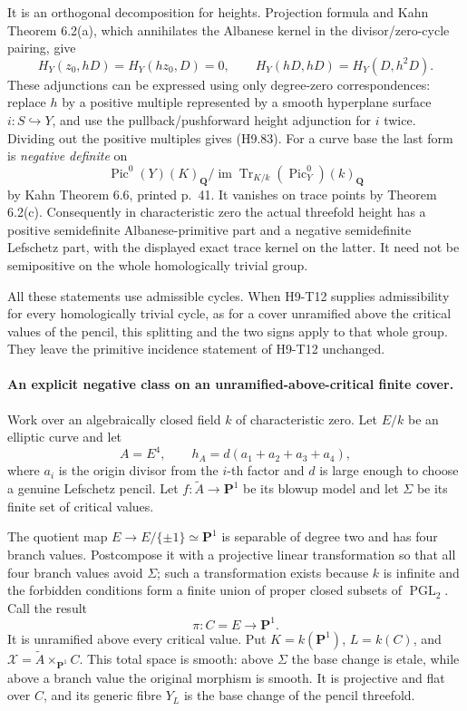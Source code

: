 It is an orthogonal decomposition for heights. Projection formula
and Kahn Theorem 6.2(a), which annihilates the Albanese kernel in
the divisor/zero-cycle pairing, give
\[
 H_Y(z_0,hD)=H_Y(hz_0,D)=0,
 \qquad
 H_Y(hD,hD)=H_Y(D,h^2D).                                   \tag{H9.83}
\]
These adjunctions can be expressed using only degree-zero
correspondences: replace $h$ by a positive multiple represented by
a smooth hyperplane surface $i:S\hookrightarrow Y$, and use the
pullback/pushforward height adjunction for $i$ twice. Dividing out
the positive multiples gives (H9.83).
For a curve base the last form is \emph{negative definite} on
\[
 \operatorname{Pic}^0(Y)(K)_{\mathbf Q}/
       \operatorname{im}\operatorname{Tr}_{K/k}
                         (\operatorname{Pic}^0_Y)(k)_{\mathbf Q}
\]
by Kahn Theorem 6.6, printed p.~41. It vanishes on trace points by
Theorem 6.2(c). Consequently in characteristic zero the actual
threefold height has a positive semidefinite Albanese-primitive
part and a negative semidefinite Lefschetz part, with the displayed
exact trace kernel on the latter. It need not be semipositive on
the whole homologically trivial group.

All these statements use admissible cycles. When H9-T12 supplies
admissibility for every homologically trivial cycle, as for a cover
unramified above the critical values of the pencil, this splitting
and the two signs apply to that whole group. They leave the
primitive incidence statement of H9-T12 unchanged.

\paragraph{An explicit negative class on an unramified-above-critical finite cover.}
Work over an algebraically closed field $k$ of characteristic zero.
Let $E/k$ be an elliptic curve and let
\[
 A=E^4,\qquad h_A=d(a_1+a_2+a_3+a_4),
\]
where $a_i$ is the origin divisor from the $i$-th factor and $d$
is large enough to choose a genuine Lefschetz pencil. Let
$f:\widetilde A\to\mathbf P^1$ be its blowup model and let
$\Sigma$ be its finite set of critical values.

The quotient map $E\to E/\{\pm1\}\simeq\mathbf P^1$ is separable
of degree two and has four branch values. Postcompose it with a
projective linear transformation so that all four branch values
avoid $\Sigma$; such a transformation exists because $k$ is
infinite and the forbidden conditions form a finite union of
proper closed subsets of $\operatorname{PGL}_2$. Call the result
\[
                   \pi:C=E\longrightarrow\mathbf P^1.
\]
It is unramified above every critical value. Put
$K=k(\mathbf P^1)$, $L=k(C)$, and
$\mathcal X=\widetilde A\times_{\mathbf P^1}C$.
This total space is smooth: above $\Sigma$ the base change is
etale, while above a branch value the original morphism is smooth.
It is projective and flat over $C$, and its generic fibre $Y_L$
is the base change of the pencil threefold.

